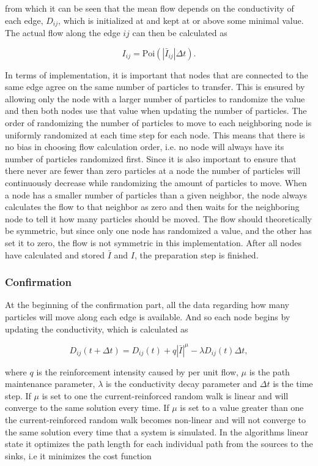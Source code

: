  \noindent from which it can be seen that the mean flow depends on the conductivity of each edge, $D_{ij}$, which is 	initialized at and kept at or above some minimal value. The actual flow along the edge $ij$ can then be calculated as

\begin{equation}
I_{ij} = \text{Poi}(|\bar{I}_{ij}|\Delta t).
\end{equation}

In terms of implementation, it is important that nodes that are connected to the same edge agree on the same number of particles to transfer. This is ensured by allowing only the node with a larger number of particles to randomize the value and then both nodes use that value when updating the number of particles. The order of randomizing the number of particles to move to each neighboring node is uniformly randomized at each time step for each node. This means that there is no bias in choosing flow calculation order, i.e. no node will always have its number of particles randomized first. Since it is also important to ensure that there never are fewer than zero particles at a node the number of particles will continuously decrease while randomizing the amount of particles to move. When a node has a smaller number of particles than a given neighbor, the node always calculates the flow to that neighbor as zero and then waits for the neighboring node to tell it how many particles should be moved. The flow should theoretically be symmetric, but since only one node has randomized a value, and the other has set it to zero, the flow is not symmetric in this implementation. After all nodes have calculated and stored $\bar{I}$ and $I$, the preparation step is finished.

\subsubsection{Confirmation}
At the beginning of the confirmation part, all the data regarding how many particles will move along each edge is available. And so each node begins by updating the conductivity, which is calculated as

\begin{equation}
D_{ij}(t + \Delta t) = D_{ij}(t) + q|\bar{I}|^\mu - \lambda D_{ij}(t)\Delta t,
\end{equation}

 \noindent where $q$ is the reinforcement intensity caused by per unit flow, $\mu$ is the path maintenance parameter, $\lambda$ is the conductivity decay parameter and $\Delta t$ is the time step. If $\mu$ is set to one the current-reinforced random walk is linear and will converge to the same solution every time. If $\mu$ is set to a value greater than one the current-reinforced random walk becomes non-linear and will not converge to the same solution every time that a system is simulated. In the algorithms linear state it optimizes the path length for each individual path from the sources to the sinks, i.e it minimizes the cost function

